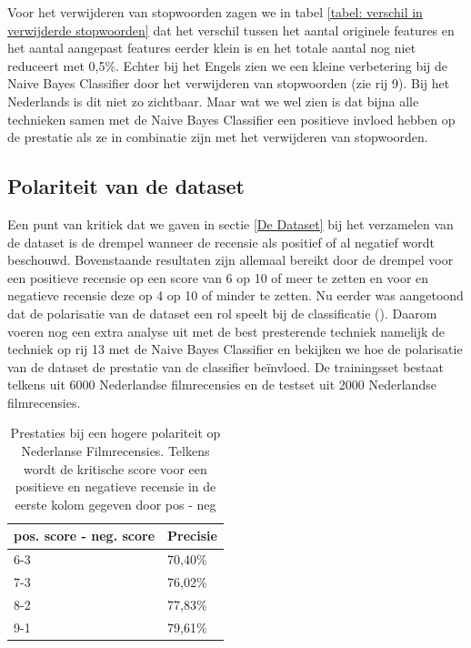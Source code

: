 Voor het verwijderen van stopwoorden zagen we in tabel \ref{tabel: verschil in verwijderde stopwoorden} dat het verschil tussen het aantal originele features en het aantal aangepast features eerder klein is en het totale aantal nog niet reduceert met 0,5\%. Echter bij het Engels zien we een kleine verbetering bij de Naive Bayes Classifier door het verwijderen van stopwoorden (zie rij 9). Bij het Nederlands is dit niet zo zichtbaar. Maar wat we wel zien is dat bijna alle technieken samen met de Naive Bayes Classifier een positieve invloed hebben op de prestatie als ze in combinatie zijn met het verwijderen van stopwoorden.\\

\subsection{Polariteit van de dataset}

Een punt van kritiek dat we gaven in sectie \ref{De Dataset} bij het verzamelen van de dataset is de drempel wanneer de recensie als positief of al negatief wordt beschouwd. Bovenstaande resultaten zijn allemaal bereikt door de drempel voor een positieve recensie op een score van 6 op 10 of meer te zetten en voor en negatieve recensie deze op 4 op 10 of minder te zetten.
Nu eerder was aangetoond dat de polarisatie van de dataset een rol speelt bij de classificatie (\cite{maas-EtAl:2011:ACL-HLT2011}). Daarom voeren nog een extra analyse uit met de best presterende techniek namelijk de techniek op rij 13 met de Naive Bayes Classifier en bekijken we hoe de polarisatie van de dataset de prestatie van de classifier be\"invloed. De trainingsset bestaat telkens uit 6000 Nederlandse filmrecensies en de testset uit 2000 Nederlandse filmrecensies.


\begin{table}[h]
\centering
\begin{tabular}{|l|l|}
\hline
\cline{2-2}
pos. score - neg. score    & Precisie \\ \hline
\multicolumn{1}{|l|}{6-3} & 70,40\%  \\ \hline
\multicolumn{1}{|l|}{7-3} & 76,02\%  \\ \hline
\multicolumn{1}{|l|}{8-2} & 77,83\%  \\ \hline
\multicolumn{1}{|l|}{9-1} & 79,61\%  \\ \hline
\end{tabular}
\caption{Prestaties bij een hogere polariteit op Nederlanse Filmrecensies. Telkens wordt de kritische score voor een positieve en negatieve recensie in de eerste kolom gegeven door pos - neg  }
\end{table}


